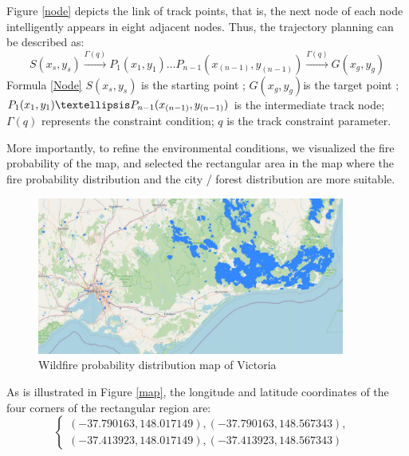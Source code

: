 \documentclass[13pt]{ctexart}
\begin{document}
Figure \ref{node} depicts the link of track points, that is, the next node of each node intelligently appears in eight adjacent nodes. Thus, the trajectory planning can be described as:
\begin{equation}
	S(x_s,y_s)\stackrel{\Gamma(q)}{\longrightarrow}P_1(x_1,y_1)…P_{n-1}(x_{(n-1)},y_{(n-1)})
	\stackrel{\Gamma(q)}{\longrightarrow}G(x_g,y_g)
	\label{Node}
\end{equation}
Formula \ref{Node} $S(x_s,y_s)$ is the starting point ; $G(x_g,y_g)$is the target point ; $P_1(x_1,y_1) … \\ P_{n-1}(x_{(n-1)},y_{(n-1)})$ is the intermediate track node; $\Gamma(q)$ represents the constraint condition; $q$ is the track constraint parameter.

More importantly, to refine the environmental conditions, we visualized the fire probability of the map, and selected the rectangular area in the map where the fire probability distribution and the city / forest distribution are more suitable. 

\begin {figure}[htb]
\centering %
\includegraphics[width=0.9\textwidth]{ff.jpg}
\caption{Wildfire probability distribution map of Victoria} %
\label{ff}
\end {figure}

As is illustrated in Figure \ref{map}, the longitude and latitude coordinates of the four corners of the rectangular region are:
\begin{equation}
	\begin{cases}
	(-37.790163, 148.017149), (-37.790163, 148.567343),& \\
	(-37.413923, 148.017149), (-37.413923, 148.567343) &
	\end{cases}
\end{equation}
\end{document}
